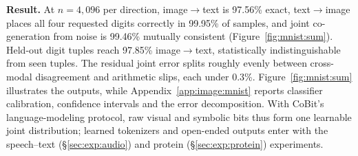 \textbf{Result.} At $n{=}4{,}096$ per direction, image$\rightarrow$text is 97.56\% exact,
text$\rightarrow$image places all four requested digits correctly in 99.95\% of samples, and
joint co-generation from noise is 99.46\% mutually consistent (Figure~\ref{fig:mnist:sum}).
Held-out digit tuples reach 97.85\% image$\rightarrow$text, statistically indistinguishable from
seen tuples. The residual joint error splits roughly evenly between cross-modal disagreement and arithmetic
slips, each under 0.3\%. Figure~\ref{fig:mnist:sum} illustrates the outputs, while
Appendix~\ref{app:image:mnist} reports classifier calibration, confidence intervals and the error
decomposition. With CoBit's language-modeling protocol, raw visual and symbolic bits thus form one learnable joint distribution; learned tokenizers and open-ended outputs enter with the speech--text (\S\ref{sec:exp:audio}) and protein (\S\ref{sec:exp:protein}) experiments.

\FloatBarrier
